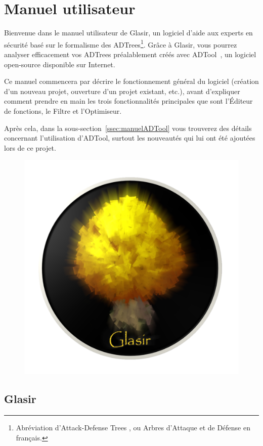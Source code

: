 \section{Manuel utilisateur}
\label{sec:manuel}

Bienvenue dans le manuel utilisateur de Glasir, un logiciel d'aide aux experts en sécurité basé sur le formalisme des ADTrees\footnote{Abréviation d'\og Attack-Defense Trees \fg{}, ou \og Arbres d'Attaque et de Défense\fg{} en français.}. Grâce à Glasir, vous pourrez analyser efficacement vos ADTrees préalablement créés avec ADTool~\cite{adtool}, un logiciel open-source disponible sur Internet.

Ce manuel commencera par décrire le fonctionnement général du logiciel (création d'un nouveau projet, ouverture d'un projet existant, etc.), avant d'expliquer comment prendre en main les trois fonctionnalités principales que sont l'Éditeur de fonctions, le Filtre et l'Optimiseur. 

Après cela, dans la {\sc sous-section}~\ref{ssec:manuelADTool} vous trouverez des détails concernant l'utilisation d'ADTool, surtout les nouveautés qui lui ont été ajoutées lors de ce projet.

	\begin{figure}[!h]
        \centering
        \includegraphics[height=0.3\textwidth]{figure/glasir.png}
    \end{figure}

\subsection{Glasir}
\label{ssec:manuelGlasir}


